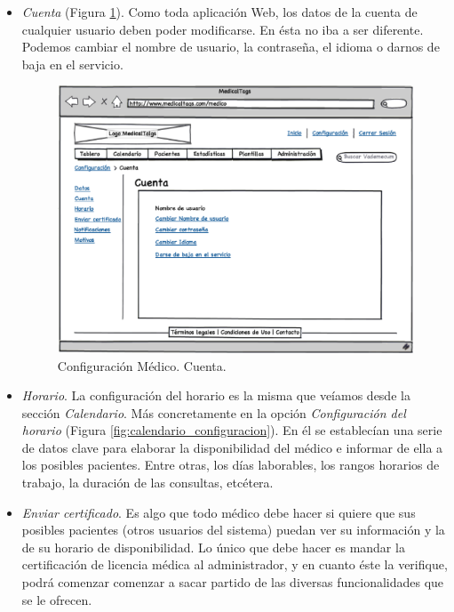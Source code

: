 \begin{itemize}
			\item \textit{Cuenta} (Figura \ref{fig:configuracion_cuenta}). Como toda aplicación Web, los datos de la cuenta de cualquier usuario deben poder modificarse. En ésta no iba a ser diferente. Podemos cambiar el nombre de usuario, la contraseña, el idioma o darnos de baja en el servicio.
			
			\begin{figure}[H]
			  \centering
			    \includegraphics[width=12cm]{img/eps/24_Configuracion_Medico2.eps}
			  \caption{Configuración Médico. Cuenta.}
			  \label{fig:configuracion_cuenta}
			\end{figure}
			
			\item \textit{Horario}. La configuración del horario es la misma que veíamos desde la sección \textit{Calendario}. Más concretamente en la opción \textit{Configuración del horario} (Figura \ref{fig:calendario_configuracion}). En él se establecían una serie de datos clave para elaborar la disponibilidad del médico e informar de ella a los posibles pacientes. Entre otras, los días laborables, los rangos horarios de trabajo, la duración de las consultas, etcétera.
			
			\item \textit{Enviar certificado}. Es algo que todo médico debe hacer si quiere que sus posibles pacientes (otros usuarios del sistema) puedan ver su información y la de su horario de disponibilidad. Lo único que debe hacer es mandar la certificación de licencia médica al administrador, y en cuanto éste la verifique, podrá comenzar comenzar a sacar partido de las diversas funcionalidades que se le ofrecen.
			

\end{itemize}
